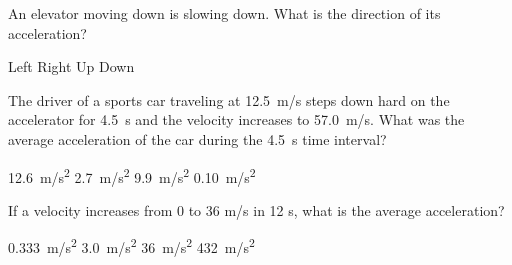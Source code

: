 \documentclass[../main-physics-problems.tex]{subfiles}
\begin{document}
\begin{questions}
\question %
An elevator moving down is slowing down. What is the direction of its acceleration?

\begin{choices}
\choice Left
\choice Right 
\correctchoice Up
\choice Down
\end{choices}












\question %
The driver of a sports car traveling at \SI{12.5}{m/s} steps down hard on the accelerator for \SI{4.5}{s} and the velocity increases to \SI{57.0}{m/s}. What was the average acceleration of the car during the \SI{4.5}{s} time interval?

\begin{choices}
\choice \SI{12.6}{m/s^2}
\choice \SI{2.7}{m/s^2}
\CorrectChoice \SI{9.9}{m/s^2}
\choice \SI{0.10}{m/s^2}
\end{choices}

\question %
If a velocity increases from 0 to 36 m/s in 12 s, what is the average acceleration?

\begin{choices}
\choice \SI{0.333}{m/s^2}
\CorrectChoice \SI{3.0}{m/s^2}
\choice \SI{36}{m/s^2}
\choice \SI{432}{m/s^2}
\end{choices}


\end{questions}
\end{document}
